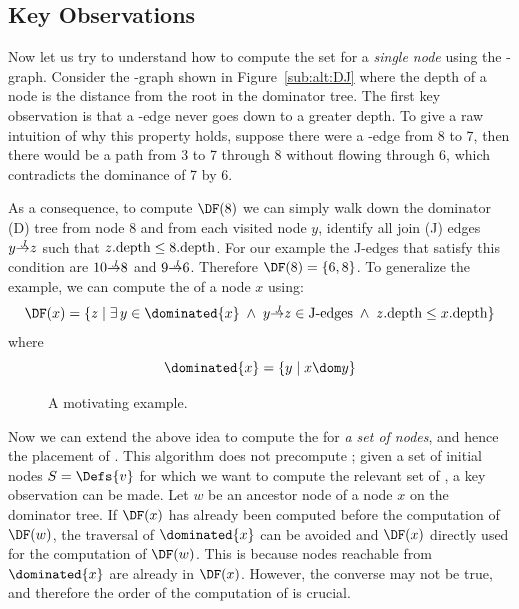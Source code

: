 {\subsection{Key Observations} 
 
Now let us try to understand how to compute the \DF set for a \emph{single node} using the \DJ-graph.
Consider the \DJ-graph shown in Figure~\ref{sub:alt:DJ} where the depth of 
a node is the  distance from the root in the dominator tree.
The first key observation is that a \DF-edge never goes down to a greater depth.
To give a raw intuition of why this property holds, suppose there were 
a \DF-edge from 
8 to 7, then there would be a path from 3 to 7 through 
  8 without flowing through 6, which contradicts the dominance of 7 by 6. 


As a consequence, to compute $\DF(8)$ we can simply walk down the dominator (D) tree from node 8 and from each visited node $y$, identify all join (J) edges $y \st{J} z$ such that $z.\textrm{depth} \leq 8.\textrm{depth}$. 
For our example the J-edges that satisfy this condition are $10 \st{J} 8$ and $9 \st{J} 6$. 
Therefore $\DF(8) = \{6, 8\}$. 
To generalize the example, we can compute the \DF of a node $x$ using:
$$\DF(x) = \{z\mid\exists\, y\in\dominated{x} \; \wedge \; y \st{J} z \in \textrm{J-edges} \; \wedge \; z.\depth \leq x.\depth \}$$
where 
$$\dominated{x} = \{ y\mid x\dom y \}$$


\begin{figure}[htb]
  \caption{A motivating example.}
  \label{fig:cfg}
\end{figure} 

Now we can extend the above idea to compute the \iDF for \emph{a set of nodes}, and hence the placement of \phifuns. 
This algorithm does not precompute \DF; 
given a set of initial nodes $S=\Defs{v}$ for which we want to compute the relevant set of \phifuns, a key observation can be made. 
Let $w$ be an ancestor node of a node $x$ on the dominator tree. 
If $\DF(x)$ has already been computed before the computation of $\DF(w)$, the traversal of $\dominated{x}$ can be avoided and $\DF(x)$ directly used for the computation of $\DF(w)$. 
This is because nodes reachable from $\dominated{x}$ are already in $\DF(x)$. 
However, the converse may not be true, and therefore the order of the computation of \DF is crucial.

}
